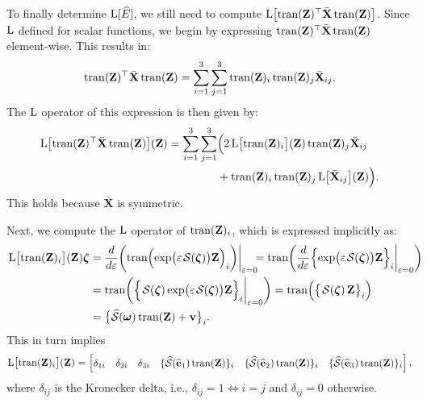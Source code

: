 To finally determine $\operatorname{L}[\widehat{E}]$, we still need to compute $\operatorname{L}\bigl[\operatorname{tran}(\mathbf{Z})^\top\bar{\mathbf{X}}\operatorname{tran}(\mathbf{Z})\bigr]$. Since $\operatorname{L}$ defined for scalar functions, we begin by expressing $\operatorname{tran}(\mathbf{Z})^\top\bar{\mathbf{X}}\operatorname{tran}(\mathbf{Z})$ element-wise. This results in:
\begin{align}
    \operatorname{tran}(\mathbf{Z})^\top\bar{\mathbf{X}}\operatorname{tran}(\mathbf{Z}) = \sum_{i=1}^{3}\sum_{j=1}^{3} \operatorname{tran}(\mathbf{Z})_{i}\operatorname{tran}(\mathbf{Z})_{j}\bar{\mathbf{X}}_{ij}.
\end{align}
The $\operatorname{L}$ operator of this expression is then given by:
\begin{align}
    \begin{split}
        \operatorname{L}\bigl[\operatorname{tran}(\mathbf{Z})^\top\bar{\mathbf{X}}\operatorname{tran}(\mathbf{Z})\bigr](\mathbf{Z}) = \sum_{i=1}^{3}\sum_{j=1}^{3}& \Bigl(2\operatorname{L}\bigl[\operatorname{tran}(\mathbf{Z})_{i}\bigr](\mathbf{Z})\operatorname{tran}(\mathbf{Z})_{j}\bar{\mathbf{X}}_{ij} \\
        & +\operatorname{tran}(\mathbf{Z})_{i}\operatorname{tran}(\mathbf{Z})_{j}\operatorname{L}\bigl[\bar{\mathbf{X}}_{ij}\bigr](\mathbf{Z})\Bigr).
    \end{split}
\end{align}
This holds because $\bar{\mathbf{X}}$ is symmetric. 

Next, we compute the $\operatorname{L}$ operator of $\operatorname{tran}(\mathbf{Z})_{i}$, which is expressed implicitly as:
\begin{align}
    \begin{split}
        \Lop\bigl[\trans(\mathbf{Z})_{i}\bigr](\mathbf{Z}) \boldsymbol{\zeta}&= 
        \frac{d}{d\varepsilon}\biggl(\trans\Bigl(\exp\bigl(\varepsilon\SL[\boldsymbol{\zeta}]\bigr)\mathbf{Z}\Bigr)_{i}\biggr)\biggr|_{\varepsilon=0}\!\!\! = 
        \trans\biggl(\frac{d}{d\varepsilon}\Bigl\{\exp\bigl(\varepsilon\SL[\boldsymbol{\zeta}]\bigr)\mathbf{Z}\Bigr\}_{i}\biggr|_{\varepsilon=0}\biggr) \!\!\!\!\!\!\\
        &= \trans\biggl(\Bigl\{\SL[\boldsymbol{\zeta}]\exp\bigl(\varepsilon\SL[\boldsymbol{\zeta}]\bigr)\mathbf{Z}\Bigr\}_{i}\biggr|_{\varepsilon=0}\biggr)
        = \trans\Bigl(\bigl\{\SL[\boldsymbol{\zeta}]\mathbf{Z}\bigr\}_{i}\Bigr)\\
        &= \bigl\{\widehat{\mathcal{S}}(\boldsymbol{\omega})\trans(\mathbf{Z}) + \mathbf{v}\bigr\}_{i}.
    \end{split}
\end{align}
This in turn implies
\begin{align}
    \operatorname{L}\bigl[\operatorname{tran}(\mathbf{Z})_{i}\bigr](\mathbf{Z}) = \begin{bmatrix}
        \delta_{1i} & \delta_{2i} & \delta_{3i} & \{\widehat{\mathcal{S}}(\widehat{\mathbf{e}}_1)\operatorname{tran}(\mathbf{Z})\}_i & \{\widehat{\mathcal{S}}(\widehat{\mathbf{e}}_2)\operatorname{tran}(\mathbf{Z})\}_i & \{\widehat{\mathcal{S}}(\widehat{\mathbf{e}}_3)\operatorname{tran}(\mathbf{Z})\}_i
    \end{bmatrix},
\end{align}
where $\delta_{ij}$ is the Kronecker delta, i.e., $\delta_{ij}=1 \iff i=j$ and $\delta_{ij}=0$ otherwise. 

